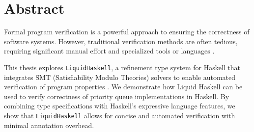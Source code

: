 
\clearpage
{}
\section*{Abstract}

\begin{center}
	\begin{minipage}[t]{0.7\textwidth}

		Formal program verification is a powerful approach to ensuring the correctness of software systems.
		However, traditional verification methods are often tedious,
		requiring significant manual effort and specialized tools or languages \cite{rondonLiquidTypes2008}.

		This thesis explores \texttt{LiquidHaskell},
		a refinement type system for Haskell that integrates SMT (Satisfiability Modulo Theories) solvers to enable automated verification of program properties \cite{vazou2018}.
		We demonstrate how Liquid Haskell can be used to verify correctness of priority queue implementations in Haskell.
		By combining type specifications with Haskell’s expressive language features,
		we show that \texttt{LiquidHaskell} allows for concise and automated verification with minimal annotation overhead.
	\end{minipage}
\end{center}

\vfill




\thispagestyle{empty}
